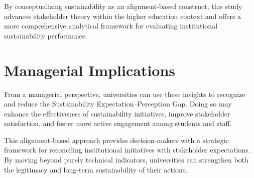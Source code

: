 \documentclass[12pt,a4paper]{article}
\begin{document}
By conceptualizing sustainability as an alignment-based construct, this study advances stakeholder theory within the higher education context and offers a more comprehensive analytical framework for evaluating institutional sustainability performance.

\section{Managerial Implications}

From a managerial perspective, universities can use these insights to recognize and reduce the Sustainability Expectation--Perception Gap. Doing so may enhance the effectiveness of sustainability initiatives, improve stakeholder satisfaction, and foster more active engagement among students and staff.

This alignment-based approach provides decision-makers with a strategic framework for reconciling institutional initiatives with stakeholder expectations. By moving beyond purely technical indicators, universities can strengthen both the legitimacy and long-term sustainability of their actions.



\end{document}
